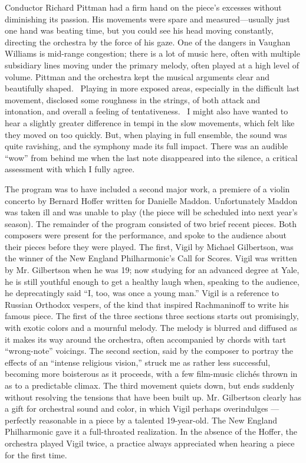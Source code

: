 Conductor Richard Pittman had a firm hand on the piece’s excesses without diminishing its passion. His movements were spare and measured—usually just one hand was beating time, but you could see his head moving constantly, directing the orchestra by the force of his gaze. One of the dangers in Vaughan Williams is mid-range congestion; there is a lot of music here, often with multiple subsidiary lines moving under the primary melody, often played at a high level of volume. Pittman and the orchestra kept the musical arguments clear and beautifully shaped.  Playing in more exposed areas, especially in the difficult last movement, disclosed some roughness in the strings, of both attack and intonation, and overall a feeling of tentativeness.  I might also have wanted to hear a slightly greater difference in tempi in the slow movements, which felt like they moved on too quickly. But, when playing in full ensemble, the sound was quite ravishing, and the symphony made its full impact. There was an audible “wow” from behind me when the last note disappeared into the silence, a critical assessment with which I fully agree.

The program was to have included a second major work, a premiere of a violin concerto by Bernard Hoffer written for Danielle Maddon. Unfortunately Maddon was taken ill and was unable to play (the piece will be scheduled into next year’s season). The remainder of the program consisted of two brief recent pieces. Both composers were present for the performance, and spoke to the audience about their pieces before they were played. The first, Vigil by Michael Gilbertson, was the winner of the New England Philharmonic’s Call for Scores. Vigil was written by Mr. Gilbertson when he was 19; now studying for an advanced degree at Yale, he is still youthful enough to get a healthy laugh when, speaking to the audience, he deprecatingly said “I, too, was once a young man.” Vigil is a reference to Russian Orthodox vespers, of the kind that inspired Rachmaninoff to write his famous piece. The first of the three sections three sections starts out promisingly, with exotic colors and a mournful melody. The melody is blurred and diffused as it makes its way around the orchestra, often accompanied by chords with tart “wrong-note” voicings. The second section, said by the composer to portray the effects of an “intense religious vision,” struck me as rather less successful, becoming more boisterous as it proceeds, with a few film-music clichés thrown in as to a predictable climax. The third movement quiets down, but ends suddenly without resolving the tensions that have been built up. Mr. Gilbertson clearly has a gift for orchestral sound and color, in which Vigil perhaps overindulges —perfectly reasonable in a piece by a talented 19-year-old. The New England Philharmonic gave it a full-throated realization. In the absence of the Hoffer, the orchestra played Vigil twice, a practice always appreciated when hearing a piece for the first time.

